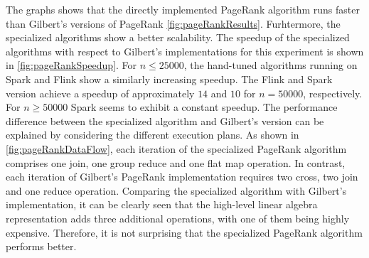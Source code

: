 The graphs shows that the directly implemented PageRank algorithm runs faster than Gilbert's versions of PageRank \cref{fig:pageRankResults}.
Furhtermore, the specialized algorithms show a better scalability.
The speedup of the specialized algorithms with respect to Gilbert's implementations for this experiment is shown in \cref{fig:pageRankSpeedup}.
For $n\le 25000$, the hand-tuned algorithms running on Spark and Flink show a similarly increasing speedup.
The Flink and Spark version achieve a speedup of approximately $14$ and $10$ for $n=50000$, respectively.
For $n\ge 50000$ Spark seems to exhibit a constant speedup.
The performance difference between the specialized algorithm and Gilbert's version can be explained by considering the different execution plans.
As shown in \cref{fig:pageRankDataFlow}, each iteration of the specialized PageRank algorithm comprises one join, one group reduce and one flat map operation.
In contrast, each iteration of Gilbert's PageRank implementation requires two cross, two join and one reduce operation.
Comparing the specialized algorithm with Gilbert's implementation, it can be clearly seen that the high-level linear algebra representation adds three additional operations, with one of them being highly expensive.
Therefore, it is not surprising that the specialized PageRank algorithm performs better.

